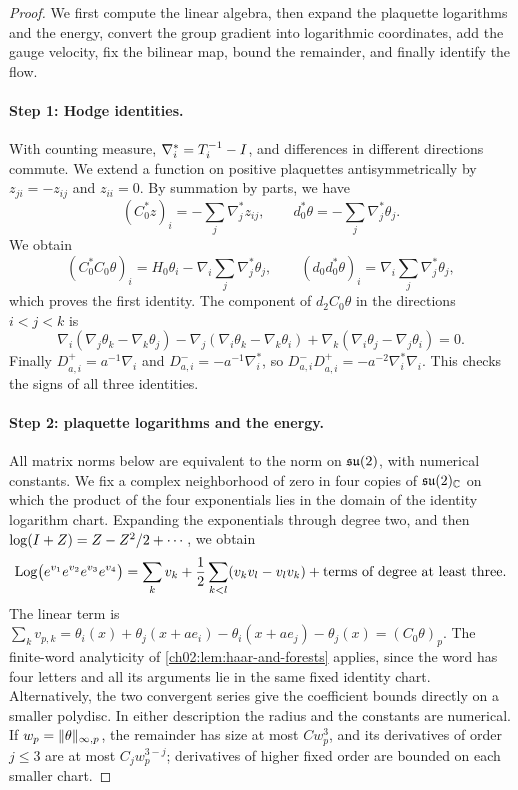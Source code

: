 \begin{proof}
We first compute the linear algebra, then expand the plaquette logarithms and the energy, convert the group gradient into logarithmic coordinates, add the gauge velocity, fix the bilinear map, bound the remainder, and finally identify the flow.

\paragraph{Step 1: Hodge identities.}
With counting measure, $\nabla_i^*=T_i^{-1}-I$, and differences in different directions commute. We extend a function on positive plaquettes antisymmetrically by $z_{ji}=-z_{ij}$ and $z_{ii}=0$. By summation by parts, we have
\begin{equation}\label{ch21:eq:curl-adjoint}
 (C_0^*z)_i=-\sum_j\nabla_j^*z_{ij},\qquad d_0^*\theta=-\sum_j\nabla_j^*\theta_j .
\end{equation}
We obtain
\[
 (C_0^*C_0\theta)_i=H_0\theta_i-\nabla_i\sum_j\nabla_j^*\theta_j,\qquad
 (d_0d_0^*\theta)_i=\nabla_i\sum_j\nabla_j^*\theta_j,
\]
which proves the first identity. The component of $d_2C_0\theta$ in the directions $i<j<k$ is
\[
 \nabla_i(\nabla_j\theta_k-\nabla_k\theta_j)-\nabla_j(\nabla_i\theta_k-\nabla_k\theta_i)+\nabla_k(\nabla_i\theta_j-\nabla_j\theta_i)=0 .
\]
Finally $D_{a,i}^+=a^{-1}\nabla_i$ and $D_{a,i}^-=-a^{-1}\nabla_i^*$, so $D_{a,i}^-D_{a,i}^+=-a^{-2}\nabla_i^*\nabla_i$. This checks the signs of all three identities.

\paragraph{Step 2: plaquette logarithms and the energy.}
All matrix norms below are equivalent to the norm on $\mathfrak{su}(2)$, with numerical constants. We fix a complex neighborhood of zero in four copies of $\mathfrak{su}(2)_{\mathbb C}$ on which the product of the four exponentials lies in the domain of the identity logarithm chart. Expanding the exponentials through degree two, and then $\log(I+Z)=Z-Z^2/2+\cdots$, we obtain
\[
 \operatorname{Log}\bigl(e^{v_1}e^{v_2}e^{v_3}e^{v_4}\bigr)=\sum_kv_k+\frac12\sum_{k<l}(v_kv_l-v_lv_k)+\text{terms of degree at least three}.
\]
The linear term is $\sum_kv_{p,k}=\theta_i(x)+\theta_j(x+ae_i)-\theta_i(x+ae_j)-\theta_j(x)=(C_0\theta)_p$. The finite-word analyticity of \cref{ch02:lem:haar-and-forests} applies, since the word has four letters and all its arguments lie in the same fixed identity chart. Alternatively, the two convergent series give the coefficient bounds directly on a smaller polydisc. In either description the radius and the constants are numerical. If $w_p=\lVert \theta\rVert_{\infty,p}$, the remainder has size at most $Cw_p^3$, and its derivatives of order $j\le3$ are at most $C_jw_p^{3-j}$; derivatives of higher fixed order are bounded on each smaller chart.


\end{proof}
